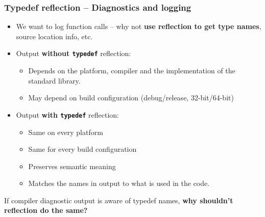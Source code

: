 \documentclass[compress,table,xcolor=table]{beamer}
\begin{document}
\begin{frame}[fragile]
\frametitle{Typedef reflection -- Diagnostics and logging}
  \begin{itemize}
  \item We want to log function calls -- why not \textbf{use reflection to get
    type names}, source location info, etc.
  \item Output \textbf{without \texttt{typedef}} reflection:
    \begin{itemize}
      \footnotesize
      \item Depends on the platform, compiler and the implementation of
        the standard library.
      \item May depend on build configuration (debug/release, 32-bit/64-bit)
    \end{itemize}
  \item Output \textbf{with \texttt{typedef}} reflection:
    \begin{itemize}
      \small
      \item Same on every platform
      \item Same for every build configuration
      \item Preserves semantic meaning
      \item Matches the names in output to what is used in the code.
    \end{itemize}
  \end{itemize}
  \Large
  If compiler diagnostic output is aware of typedef names,
    \textbf{why shouldn't reflection do the same?}
\end{frame}
\end{document}
